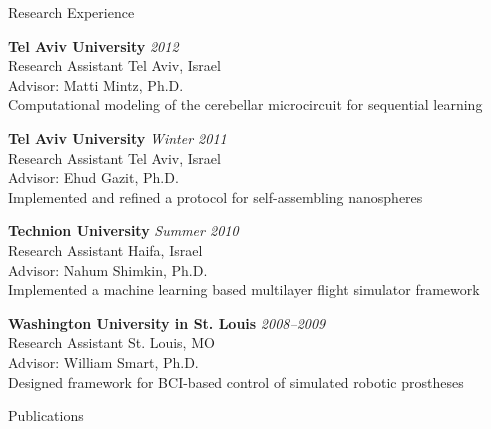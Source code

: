 \documentclass{resume} %
\begin{document}
\begin{rSection}{Research Experience}


\textbf{Tel Aviv University} \hfill \emph{2012} \\
Research Assistant \hfill Tel Aviv, Israel \\
Advisor: Matti Mintz, Ph.D. \\
Computational modeling of the cerebellar microcircuit for sequential learning

\textbf{Tel Aviv University} \hfill \emph{Winter 2011} \\
Research Assistant \hfill Tel Aviv, Israel \\
Advisor: Ehud Gazit, Ph.D. \\
Implemented and refined a protocol for self-assembling nanospheres

\textbf{Technion University} \hfill \emph{Summer 2010} \\
Research Assistant \hfill Haifa, Israel \\
Advisor: Nahum Shimkin, Ph.D. \\
Implemented a machine learning based multilayer flight simulator framework

\textbf{Washington University in St. Louis} \hfill \emph{2008--2009} \\
Research Assistant \hfill St. Louis, MO \\
Advisor: William Smart, Ph.D. \\
Designed framework for BCI-based control of simulated robotic prostheses

\end{rSection}


\begin{rSection}{Publications}
\nocite{*}
\printbibliography[heading=none]
\end{rSection}
\end{document}
